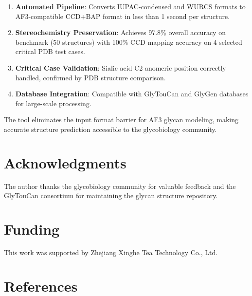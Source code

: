 \begin{enumerate}
\item \textbf{Automated Pipeline}: Converts IUPAC-condensed and WURCS formats to AF3-compatible CCD+BAP format in less than 1 second per structure.

\item \textbf{Stereochemistry Preservation}: Achieves 97.8\% overall accuracy on benchmark (50 structures) with 100\% CCD mapping accuracy on 4 selected critical PDB test cases.

\item \textbf{Critical Case Validation}: Sialic acid C2 anomeric position correctly handled, confirmed by PDB structure comparison.

\item \textbf{Database Integration}: Compatible with GlyTouCan and GlyGen databases for large-scale processing.
\end{enumerate}

The tool eliminates the input format barrier for AF3 glycan modeling, making accurate structure prediction accessible to the glycobiology community.

\section*{Acknowledgments}

The author thanks the glycobiology community for valuable feedback and the GlyTouCan consortium for maintaining the glycan structure repository.

\section*{Funding}

This work was supported by Zhejiang Xinghe Tea Technology Co., Ltd.

\section*{References}





